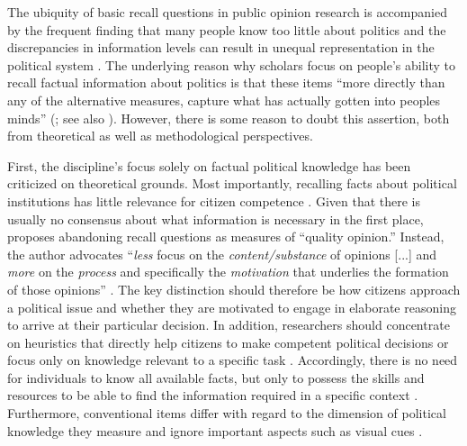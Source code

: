 The ubiquity of basic recall questions in public opinion research is accompanied by the frequent finding that many people know too little about politics \citep{carpini1996americans,barabas2014question} and the discrepancies in information levels can result in unequal representation in the political system \citep{althaus1998information,kuklinski2000misinformation,gilens2001political}. The underlying reason why scholars focus on people's ability to recall factual information about politics is that these items ``more directly than any of the alternative measures, capture what has actually gotten into peoples minds'' (\citealt[21]{zaller1992nature}; see also \citealt{zaller1991information,gomez2001political}). However, there is some reason to doubt this assertion, both from theoretical as well as methodological perspectives.

First, the discipline's focus solely on factual political knowledge has been criticized on theoretical grounds. Most importantly, recalling facts about political institutions  has little relevance for citizen competence \citep{lupia2006elitism,cramer2017fact}. Given that there is usually no consensus about what information is necessary in the first place, \citet{druckman2014pathologies} proposes abandoning recall questions as measures of ``quality opinion.'' Instead, the author advocates ``\textit{less} focus on the \textit{content/substance} of opinions [...] and \textit{more} on the \textit{process} and specifically the \textit{motivation} that underlies the formation of those opinions'' \citeyearpar[478, emphasis in the original]{druckman2014pathologies}. The key distinction should therefore be how citizens approach a political issue and whether they are motivated to engage in elaborate reasoning to arrive at their particular decision. In addition, researchers should concentrate on heuristics that directly help citizens to make competent political decisions or focus only on knowledge relevant to a specific task \citep[see also][]{lupia1994shortcuts}. Accordingly, there is no need for individuals to know all available facts, but only to possess the skills and resources to be able to find the information required in a specific context \citep{prior2008money}. Furthermore, conventional items differ with regard to the dimension of political knowledge they measure \citep{barabas2014question} and ignore important aspects such as visual cues \citep{prior2014visual}.

